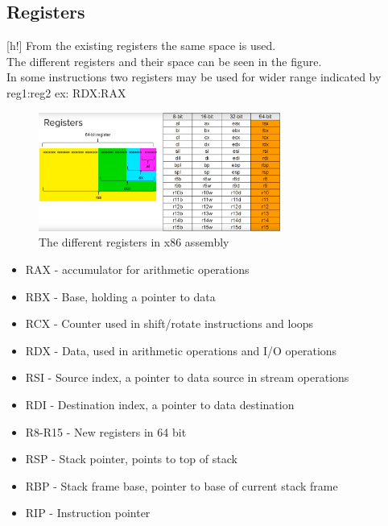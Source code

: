 \documentclass[12pt, a4paper]{article}
\begin{document}
		\subsection{Registers}[h!]
			From the existing registers the same space is used.\\
			The different registers and their space can be seen in the figure.\\
			In some instructions two registers may be used for wider range indicated by reg1:reg2 ex: RDX:RAX
			\begin{figure}
				\centering
				\includegraphics[width=300px]{assets/assemblyRegisters.png}
				\caption{The different registers in x86 assembly}
			\end{figure}
			\begin{itemize}
				\item RAX - accumulator for arithmetic operations
				\item RBX - Base, holding a pointer to data
				\item RCX - Counter used in shift/rotate instructions and loops
				\item RDX - Data, used in arithmetic operations and I/O operations
				\item RSI - Source index, a pointer to data source in stream operations
				\item RDI - Destination index, a pointer to data destination
				\item R8-R15 - New registers in 64 bit
				\item RSP - Stack pointer, points to top of stack
				\item RBP - Stack frame base, pointer to base of current stack frame
				\item RIP - Instruction pointer
			\end{itemize}
\end{document}
